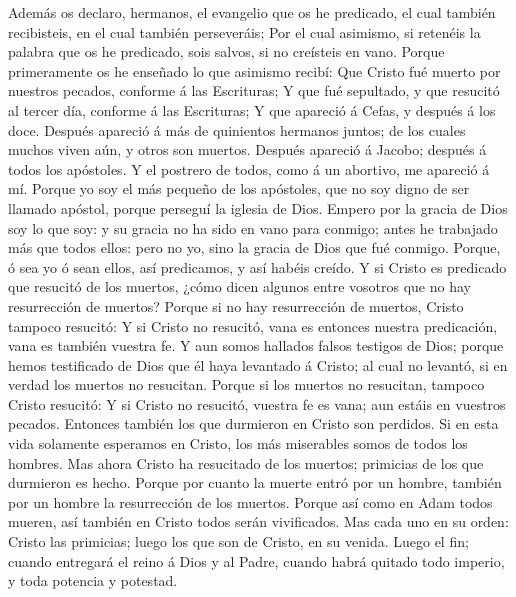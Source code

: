  Además os declaro, hermanos, el evangelio que os he
predicado, el cual también recibisteis, en el cual también perseveráis;
 Por el cual asimismo, si retenéis la palabra que os he
predicado, sois salvos, si no creísteis en vano.  Porque
primeramente os he enseñado lo que asimismo recibí: Que Cristo fué
muerto por nuestros pecados, conforme á las Escrituras;  Y
que fué sepultado, y que resucitó al tercer día, conforme á las
Escrituras;  Y que apareció á Cefas, y después á los doce.
 Después apareció á más de quinientos hermanos juntos; de
los cuales muchos viven aún, y otros son muertos.  Después
apareció á Jacobo; después á todos los apóstoles.  Y el
postrero de todos, como á un abortivo, me apareció á mí. 
Porque yo soy el más pequeño de los apóstoles, que no soy digno de ser
llamado apóstol, porque perseguí la iglesia de Dios. 
Empero por la gracia de Dios soy lo que soy: y su gracia no ha sido en
vano para conmigo; antes he trabajado más que todos ellos: pero no yo,
sino la gracia de Dios que fué conmigo.  Porque, ó sea yo ó
sean ellos, así predicamos, y así habéis creído.  Y si
Cristo es predicado que resucitó de los muertos, ¿cómo dicen algunos
entre vosotros que no hay resurrección de muertos?  Porque
si no hay resurrección de muertos, Cristo tampoco resucitó:
 Y si Cristo no resucitó, vana es entonces nuestra
predicación, vana es también vuestra fe.  Y aun somos
hallados falsos testigos de Dios; porque hemos testificado de Dios que
él haya levantado á Cristo; al cual no levantó, si en verdad los muertos
no resucitan.  Porque si los muertos no resucitan, tampoco
Cristo resucitó:  Y si Cristo no resucitó, vuestra fe es
vana; aun estáis en vuestros pecados.  Entonces también los
que durmieron en Cristo son perdidos.  Si en esta vida
solamente esperamos en Cristo, los más miserables somos de todos los
hombres.  Mas ahora Cristo ha resucitado de los muertos;
primicias de los que durmieron es hecho.  Porque por cuanto
la muerte entró por un hombre, también por un hombre la resurrección de
los muertos.  Porque así como en Adam todos mueren, así
también en Cristo todos serán vivificados.  Mas cada uno en
su orden: Cristo las primicias; luego los que son de Cristo, en su
venida.  Luego el fin; cuando entregará el reino á Dios y
al Padre, cuando habrá quitado todo imperio, y toda potencia y potestad.
